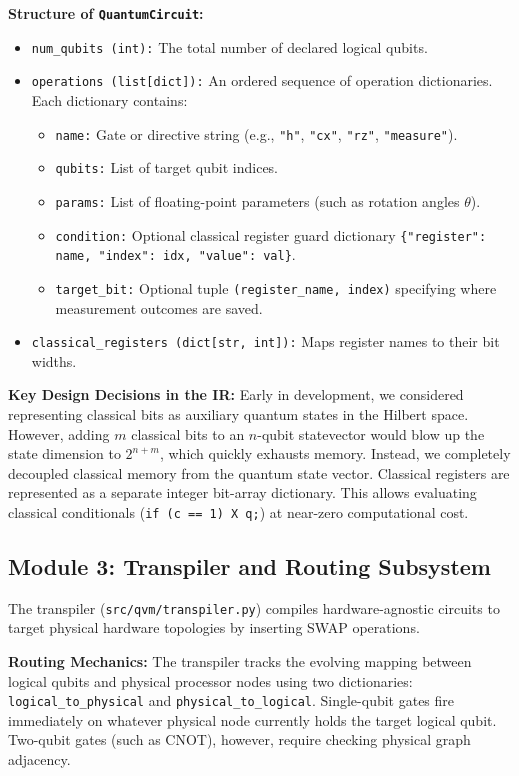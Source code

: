 \textbf{Structure of \texttt{QuantumCircuit}:}
\begin{itemize}[leftmargin=*]
    \item \texttt{num\_qubits (int):} The total number of declared logical qubits.
    \item \texttt{operations (list[dict]):} An ordered sequence of operation dictionaries. Each dictionary contains:
    \begin{itemize}
        \item \texttt{name:} Gate or directive string (e.g., \texttt{"h"}, \texttt{"cx"}, \texttt{"rz"}, \texttt{"measure"}).
        \item \texttt{qubits:} List of target qubit indices.
        \item \texttt{params:} List of floating-point parameters (such as rotation angles $\theta$).
        \item \texttt{condition:} Optional classical register guard dictionary \texttt{\{"register": name, "index": idx, "value": val\}}.
        \item \texttt{target\_bit:} Optional tuple \texttt{(register\_name, index)} specifying where measurement outcomes are saved.
    \end{itemize}
    \item \texttt{classical\_registers (dict[str, int]):} Maps register names to their bit widths.
\end{itemize}

\textbf{Key Design Decisions in the IR:}
Early in development, we considered representing classical bits as auxiliary quantum states in the Hilbert space. However, adding $m$ classical bits to an $n$-qubit statevector would blow up the state dimension to $2^{n+m}$, which quickly exhausts memory. Instead, we completely decoupled classical memory from the quantum state vector. Classical registers are represented as a separate integer bit-array dictionary. This allows evaluating classical conditionals (\texttt{if (c == 1) X q;}) at near-zero computational cost.

\subsection{Module 3: Transpiler and Routing Subsystem}
The transpiler (\texttt{src/qvm/transpiler.py}) compiles hardware-agnostic circuits to target physical hardware topologies by inserting SWAP operations.

\textbf{Routing Mechanics:}
The transpiler tracks the evolving mapping between logical qubits and physical processor nodes using two dictionaries: \texttt{logical\_to\_physical} and \texttt{physical\_to\_logical}. Single-qubit gates fire immediately on whatever physical node currently holds the target logical qubit. Two-qubit gates (such as CNOT), however, require checking physical graph adjacency.

